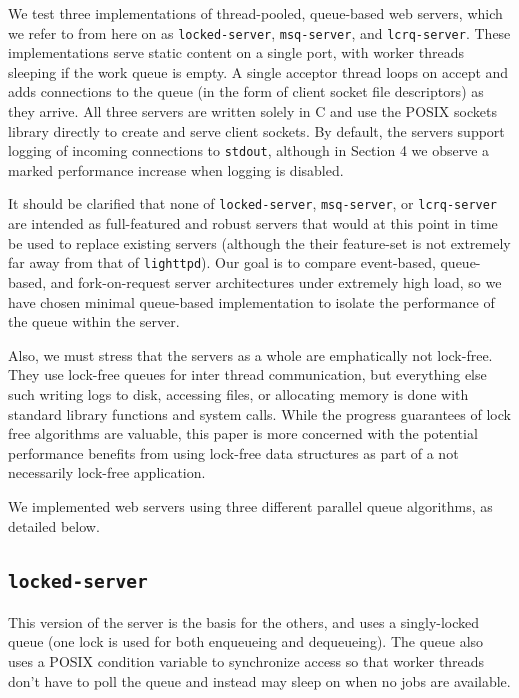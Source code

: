 \documentclass[twoside,10pt]{article}
\begin{document}
\begin{multicols}{2}
We test three implementations of thread-pooled, queue-based web
servers, which we refer to from here on as \verb+locked-server+,
\verb+msq-server+, and \verb+lcrq-server+. These implementations serve
static content on a single port, with worker threads sleeping if the
work queue is empty. A single acceptor thread loops on accept and adds
connections to the queue (in the form of client socket file
descriptors) as they arrive. All three servers are written solely in C
and use the POSIX sockets library directly to create and serve client
sockets. By default, the servers support logging of incoming
connections to \verb+stdout+, although in Section 4 we observe a
marked performance increase when logging is disabled.

It should be clarified that none of \verb+locked-server+,
\verb+msq-server+, or \verb+lcrq-server+ are intended as full-featured
and robust servers that would at this point in time be used to replace
existing servers (although the their feature-set is not extremely far
away from that of \verb+lighttpd+). Our goal is to compare
event-based, queue-based, and fork-on-request server architectures
under extremely high load, so we have chosen minimal queue-based
implementation to isolate the performance of the queue within the
server.

Also, we must stress that the servers as a whole are emphatically not
lock-free. They use lock-free queues for inter thread communication,
but everything else such writing logs to disk, accessing files, or
allocating memory is done with standard library functions and system
calls. While the progress guarantees of lock free algorithms are
valuable, this paper is more concerned with the potential performance
benefits from using lock-free data structures as part of a
not necessarily lock-free application.

We implemented web servers using three different parallel queue
algorithms, as detailed below.

\subsection{\texttt{locked-server}}

This version of the server is the basis for the others, and uses a
singly-locked queue (one lock is used for both enqueueing and
dequeueing). The queue also uses a POSIX condition variable to synchronize
access so that worker threads don't have to poll the queue and instead may
sleep on when no jobs are available.


\end{multicols}
\end{document}
